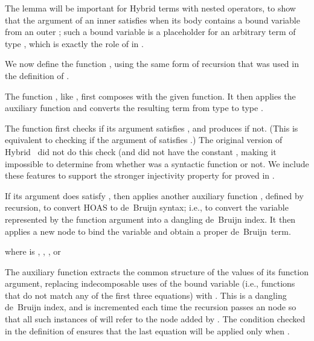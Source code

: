 \documentclass[copyright,creativecommons]{eptcs}
\begin{document}
The lemma  will be important for Hybrid terms with nested
 operators, to show that the argument of an inner  satisfies
 when its body contains a bound variable from an outer ;
such a bound variable is a placeholder for an arbitrary term of type
, which is exactly the role of  in .

We now define the function , using the same form of recursion
that was used in the definition of .

\begin{Defn}
\label{defn:hybrid-LAM} \formal
\par\nopagebreak
\par\nopagebreak[3]
\par\nopagebreak

\end{Defn}

The function , like , first composes   with the
given function.  It then applies the auxiliary function  and
converts the resulting term from type  to type .

The function  first checks if its argument satisfies ,
and produces  if not.  (This is equivalent to checking if the
argument of  satisfies .)  The original version of
Hybrid~\cite{ambler/crole/momigliano:2002} did not do this check (and did
not have the constant , making it impossible to determine from
 whether  was a syntactic function or not.  We include
these features to support the stronger injectivity property for 
proved in .

If its argument does satisfy , then  applies another
auxiliary function , defined by recursion, to convert HOAS to
de~Bruijn syntax; i.e., to convert the variable represented by the
function argument into a dangling de~Bruijn index.  It then applies a
new  node to bind the variable and obtain a proper de~Bruijn~term.

\begin{Defn}
\label{defn:hybrid-Lbind} \formal
\par\nopagebreak

      where  is\/ , , ,
      or\/ \par\nopagebreak
\par\nopagebreak[3]
\par\nopagebreak
 \end{Defn}

The auxiliary function  extracts the common structure of the
values of its function argument, replacing indecomposable uses of the bound
variable (i.e., functions that do not match any of the first three equations)
with .  This is a dangling de~Bruijn index, and  is
incremented each time the recursion passes an  node so that all
such instances of  will refer to the  node added by
.  The  condition checked in the definition of
 ensures that the last equation will be applied only when
.
\end{document}

